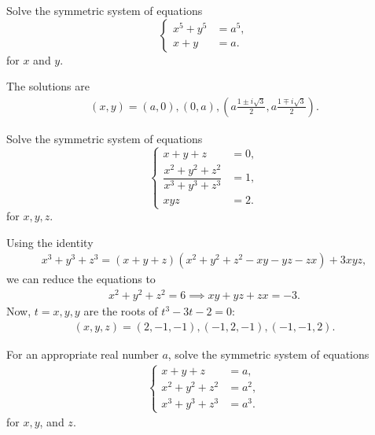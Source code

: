 \documentclass[12pt,a4paper]{memoir}
\theoremstyle{definition}
\begin{document}
\begin{question}\label{p:sys-eq-E}
	Solve the symmetric system of equations $$\begin{cases}
		x^5+y^5 &= a^5,\\ x+y &= a.
	\end{cases}$$ for $x$ and $y$.
\end{question}


\begin{solution}
	The solutions are
	\begin{align*}
		(x,y) = (a,0), (0,a), \left(a\frac{1\pm i\sqrt{3}}{2},a\frac{1\mp i\sqrt{3}}{2}\right).
	\end{align*}
\end{solution}



\begin{question}\label{p:sys-eq-F}
	Solve the symmetric system of equations $$\begin{cases}
		x+y+z &= 0,\\ \dfrac{x^2+y^2+z^2}{x^3+y^3+z^3} &=1,\\xyz &=2.
	\end{cases}$$ for $x,y,z$.
\end{question}


\begin{solution}
	Using the identity
	\begin{align*}
		x^3+y^3+z^3=(x+y+z)(x^2+y^2+z^2-xy-yz-zx)+3xyz,
	\end{align*}
	we can reduce the equations to
	\begin{align*}
		x^2+y^2+z^2=6 \implies xy+yz+zx=-3.
	\end{align*}
	Now, $t=x,y,y$ are the roots of $t^3-3t-2=0$:
	\begin{align*}
		(x,y,z)=(2,-1,-1), (-1,2,-1), (-1,-1,2).
	\end{align*}
\end{solution}


\begin{question}\label{p:sys-eq-G}
	For an appropriate real number $a$, solve the symmetric system of equations 
	\begin{align*}
		\begin{cases}
			x+y+z &=a,\\x^2+y^2+z^2 &=a^2,\\x^3+y^3+z^3 &=a^3.
		\end{cases}
	\end{align*}
	for $x,y$, and $z$.
\end{question}
\end{document}
